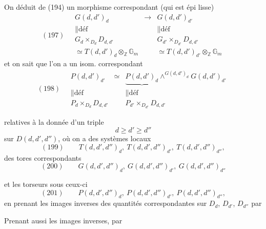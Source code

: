 \documentclass[11pt,a4paper]{article}
\begin{document}
On déduit de (194) un morphisme correspondant (qui est épi lisse)
\[
  (197) \quad
  \begin{array}{ccc}
    G(d,d')_d & \longrightarrow & G(d,d')_{d'} \\
    \| \text{déf} & & \| \text{déf} \\
    G_d \times_{D_d} D_{d,d'} & & G_{d'} \times_{D_{d'}} D_{d,d'} \\
    \simeq T(d,d')_d \otimes_{\mathbb{Z}} \mathbb{G}_m & & \simeq T(d,d')_{d'} \otimes_{\mathbb{Z}} \mathbb{G}_m
  \end{array}
\]
et on sait que l'on a un isom. correspondant
\[
  (198) \quad
  \begin{array}{ccc}
    P(d,d')_{d'} & \simeq & \underbrace{P(d,d')_d} \wedge^{G(d,d')_d} G(d,d')_{d'} \\
    \| \text{déf} & & \| \text{déf} \\
    P_d \times_{D_d} D_{d,d'} & & P_{d'} \times_{D_{d'}} D_{d,d'}
  \end{array}
\]

  relatives \struck{\ill{}} à la donnée d'un triple
\[
  d \geqslant d' \geqslant d''
\]
 sur $D(d,d',d'')$, où on a des 
systèmes locaux
\[
  (199) \qquad T(d,d',d'')_d,\ T(d,d',d'')_{d'},\ T(d,d',d'')_{d''},
\]
des tores correspondants
\[
  (200) \qquad G(d,d',d'')_d,\ G(d,d',d'')_{d'},\ G(d,d',d'')_{d''}
\]

et les torseurs sous ceux-ci
\[
  (201) \qquad P(d,d',d'')_d,\ P(d,d',d'')_{d'},\ P(d,d',d'')_{d''},
\]
en prenant les images inverses des quantités correspondantes sur
$D_d$, $D_{d'}$, $D_{d''}$  par


Prenant aussi les images inverses, par

\end{document}
